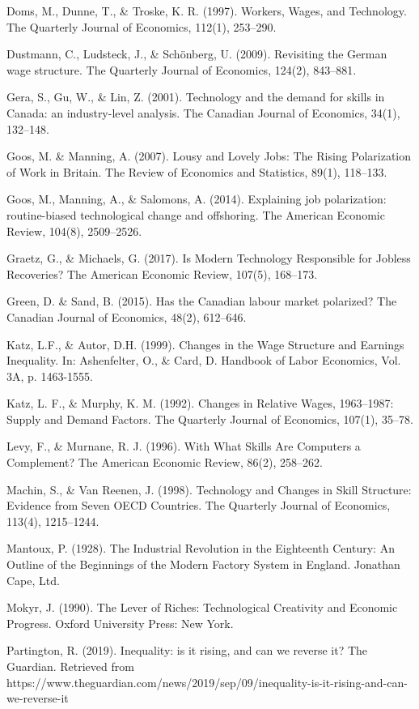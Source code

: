 \documentclass[undefended]{bumrp}
\begin{document}
\begin{hangparas}{.25in}{1}
Doms, M., Dunne, T.,  \& Troske, K. R. (1997). Workers, Wages, and Technology. The Quarterly Journal of Economics, 112(1), 253–290.

Dustmann, C., Ludsteck, J.,  \& Schönberg, U. (2009). Revisiting the German wage structure. The Quarterly Journal of Economics, 124(2), 843–881.

Gera, S., Gu, W.,  \& Lin, Z. (2001). Technology and the demand for skills in Canada: an industry-level analysis. The Canadian Journal of Economics, 34(1), 132–148.

Goos, M.  \& Manning, A. (2007). Lousy and Lovely Jobs: The Rising Polarization of Work in Britain. The Review of Economics and Statistics, 89(1), 118–133. 

Goos, M., Manning, A.,  \& Salomons, A. (2014). Explaining job polarization: routine-biased technological change and offshoring. The American Economic Review, 104(8), 2509–2526. 

Graetz, G.,  \& Michaels, G. (2017). Is Modern Technology Responsible for Jobless Recoveries? The American Economic Review, 107(5), 168–173. 

Green, D.  \& Sand, B. (2015). Has the Canadian labour market polarized? The Canadian Journal of Economics, 48(2), 612–646.

Katz, L.F.,  \& Autor, D.H. (1999). Changes in the Wage Structure and Earnings Inequality. In: Ashenfelter, O., \& Card, D. Handbook of Labor Economics, Vol. 3A, p. 1463-1555.

Katz, L. F.,  \& Murphy, K. M. (1992). Changes in Relative Wages, 1963–1987: Supply and Demand Factors. The Quarterly Journal of Economics, 107(1), 35–78.

Levy, F.,  \& Murnane, R. J. (1996). With What Skills Are Computers a Complement? The American Economic Review, 86(2), 258–262.

Machin, S.,  \& Van Reenen, J. (1998). Technology and Changes in Skill Structure: Evidence from Seven OECD Countries. The Quarterly Journal of Economics, 113(4), 1215–1244.

Mantoux, P. (1928). The Industrial Revolution in the Eighteenth Century: An Outline of the Beginnings of the Modern Factory System in England. Jonathan Cape, Ltd.

Mokyr, J. (1990). The Lever of Riches: Technological Creativity and Economic Progress. Oxford University Press: New York.

Partington, R. (2019). Inequality: is it rising, and can we reverse it? The Guardian. Retrieved from https://www.theguardian.com/news/2019/sep/09/inequality-is-it-rising-and-can-we-reverse-it


\end{hangparas}
\end{document}
